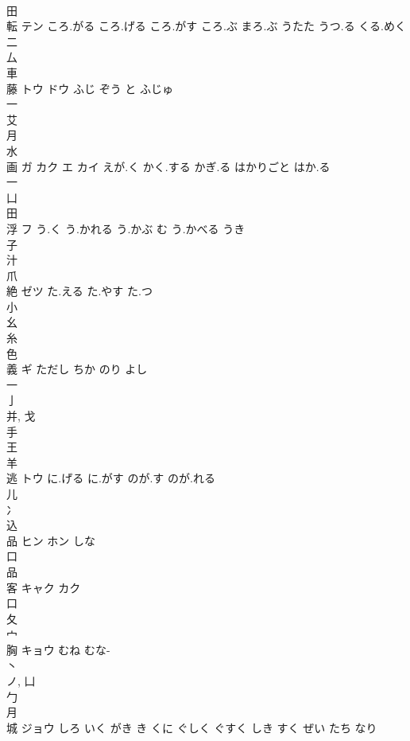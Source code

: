 \documentclass[8pt]{extreport}
\begin{document}
\begin{CJK}{UTF8}{min}
\\	田 
\\	転	テン	ころ.がる ころ.げる ころ.がす ころ.ぶ まろ.ぶ うたた うつ.る くる.めく	
\\	二 
\\	厶 
\\	車 
\\	藤	トウ ドウ	ふじ ぞう と ふじゅ	
\\	一 
\\	艾 
\\	月 
\\	水 
\\	画	ガ カク エ カイ	えが.く かく.する かぎ.る はかりごと はか.る	
\\	一 
\\	凵 
\\	田 
\\	浮	フ	う.く う.かれる う.かぶ む う.かべる うき	
\\	子 
\\	汁 
\\	爪 
\\	絶	ゼツ	た.える た.やす た.つ	
\\	小 
\\	幺 
\\	糸 
\\	色 
\\	義	ギ	ただし ちか のり よし	
\\	一 
\\	亅 
\\	并, 戈 
\\	手 
\\	王 
\\	羊 
\\	逃	トウ	に.げる に.がす のが.す のが.れる	
\\	儿 
\\	冫 
\\	込 
\\	品	ヒン ホン	しな	
\\	口 
\\	品 
\\	客	キャク カク		
\\	口 
\\	夂 
\\	宀 
\\	胸	キョウ	むね むな-	
\\	丶 
\\	ノ, 凵 
\\	勹 
\\	月 
\\	城	ジョウ	しろ いく がき き くに ぐしく ぐすく しき すく ぜい たち なり	

\end{CJK}
\end{document}
